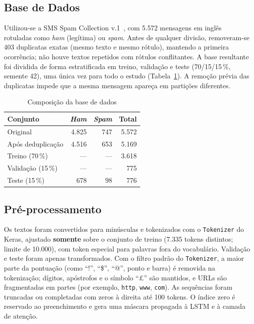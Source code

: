 \documentclass[conference]{IEEEtran}
\begin{document}
\subsection{Base de Dados}
Utilizou-se a SMS Spam Collection v.1~\cite{uci_sms}, com 5.572 mensagens em inglês rotuladas como \textit{ham} (legítima) ou \textit{spam}. Antes de qualquer divisão, removeram-se 403 duplicatas exatas (mesmo texto e mesmo rótulo), mantendo a primeira ocorrência; não houve textos repetidos com rótulos conflitantes. A base resultante foi dividida de forma estratificada em treino, validação e teste (70/15/15\,\%, semente 42), uma única vez para todo o estudo (Tabela~\ref{tab:dados}). A remoção prévia das duplicatas impede que a mesma mensagem apareça em partições diferentes.

\begin{table}[!t]
\caption{Composição da base de dados}
\label{tab:dados}
\centering
\footnotesize
\begin{tabular}{lrrr}
\toprule
Conjunto & \textit{Ham} & \textit{Spam} & Total \\
\midrule
Original                & 4.825 & 747 & 5.572 \\
Após deduplicação       & 4.516 & 653 & 5.169 \\
\midrule
Treino (70\,\%)         & --- & --- & 3.618 \\
Validação (15\,\%)      & --- & --- & 775 \\
Teste (15\,\%)          & 678 & 98 & 776 \\
\bottomrule
\end{tabular}
\end{table}

\subsection{Pré-processamento}
Os textos foram convertidos para minúsculas e tokenizados com o \texttt{Tokenizer} do Keras, ajustado \textbf{somente} sobre o conjunto de treino (7.335 tokens distintos; limite de 10.000), com token especial para palavras fora do vocabulário. Validação e teste foram apenas transformados. Com o filtro padrão do \texttt{Tokenizer}, a maior parte da pontuação (como ``!'', ``\$'', ``@'', ponto e barra) é removida na tokenização; dígitos, apóstrofos e o símbolo ``\pounds'' são mantidos, e URLs são fragmentadas em partes (por exemplo, \texttt{http}, \texttt{www}, \texttt{com}). As sequências foram truncadas ou completadas com zeros à direita até 100 tokens. O índice zero é reservado ao preenchimento e gera uma máscara propagada à LSTM e à camada de atenção.
\end{document}
